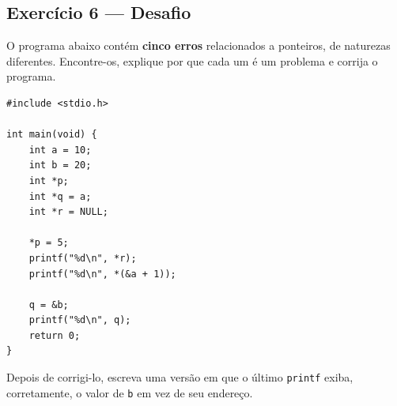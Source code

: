 \begin{exercicio}
\subsection*{Exercício 6 --- Desafio}
O programa abaixo contém \textbf{cinco erros} relacionados a ponteiros, de naturezas diferentes. Encontre-os, explique por que cada um é um problema e corrija o programa.

\begin{lstlisting}
#include <stdio.h>

int main(void) {
    int a = 10;
    int b = 20;
    int *p;
    int *q = a;
    int *r = NULL;

    *p = 5;
    printf("%d\n", *r);
    printf("%d\n", *(&a + 1));

    q = &b;
    printf("%d\n", q);
    return 0;
}
\end{lstlisting}

Depois de corrigi-lo, escreva uma versão em que o último \texttt{printf} exiba, corretamente, o valor de \texttt{b} em vez de seu endereço.

\end{exercicio}